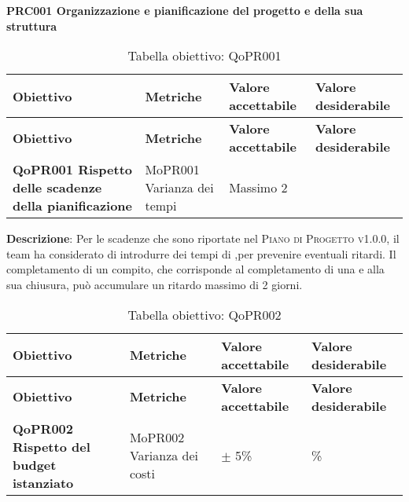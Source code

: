 \documentclass[../piano-di-qualifica.tex]{subfiles}
\begin{document}
\begin{center}
    \centering
    \textbf{PRC001 Organizzazione e pianificazione del progetto e della sua struttura}
\end{center}

\renewcommand{\arraystretch}{2} %
\begin{longtable}[H]{>{\centering\bfseries}m{5cm} >{\centering}m{5cm} >{\centering}m{2.5cm} >{\centering\arraybackslash}m{2.5cm}}  
    \caption{Tabella obiettivo: QoPR001}%
    \label{tab:obiettivo_qopr001} \\
  \rowcolor{lightgray}
  {\textbf{Obiettivo}} & {\textbf{Metriche}} & {\textbf{Valore accettabile}} & {\textbf{Valore desiderabile}}  \\
  \endfirsthead%
  \rowcolor{lightgray}
  {\textbf{Obiettivo}} & {\textbf{Metriche}} & {\textbf{Valore accettabile}} & {\textbf{Valore desiderabile}}  \\
  \endhead%
  \textbf{QoPR001 Rispetto delle scadenze della pianificazione} & MoPR001 Varianza dei tempi & Massimo 2 & 0 \\
\end{longtable}

\textbf{Descrizione}: Per le scadenze che sono riportate nel \textsc{Piano di Progetto v1.0.0}, il team ha considerato di introdurre dei tempi di ,per prevenire eventuali ritardi.  Il completamento di un compito, che corrisponde al completamento di una  e alla sua chiusura, può accumulare un ritardo massimo di 2 giorni.


\renewcommand{\arraystretch}{2} %
\begin{longtable}[H]{>{\centering\bfseries}m{5cm} >{\centering}m{5cm} >{\centering}m{2.5cm} >{\centering\arraybackslash}m{2.5cm}}  
    \caption{Tabella obiettivo: QoPR002}%
    \label{tab:obiettivo_qopr002} \\
  \rowcolor{lightgray}
  {\textbf{Obiettivo}} & {\textbf{Metriche}} & {\textbf{Valore accettabile}} & {\textbf{Valore desiderabile}}  \\
  \endfirsthead%
  \rowcolor{lightgray}
  {\textbf{Obiettivo}} & {\textbf{Metriche}} & {\textbf{Valore accettabile}} & {\textbf{Valore desiderabile}}  \\
  \endhead%
  \textbf{QoPR002 Rispetto del budget istanziato} & MoPR002 Varianza dei costi & $\pm$ 5\% & 0\% \\
\end{longtable}
\end{document}
